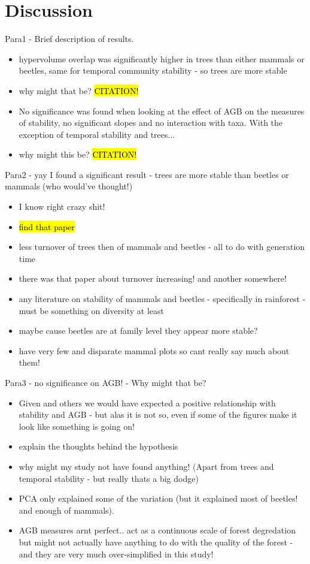 
\section{Discussion}

Para1 - Brief description of results.
\begin{itemize}
	\item hypervolume overlap was significantly higher in trees than either mammals or beetles, same for temporal community stability - so trees are more stable
	\item why might that be? \hl{CITATION!}
	\item No significance was found when looking at the effect of AGB on the measures of stability, no significant slopes and no interaction with taxa. With the exception of temporal stability and trees...
	\item why might this be? \hl{CITATION!}
\end{itemize}

Para2 - yay I found a significant result - trees are more stable than beetles or mammals (who would've thought!)
\begin{itemize}
	\item I know right crazy shit!
	\item \hl{find that paper}
	\item less turnover of trees then of mammals and beetles - all to do with generation time
	\item there was that paper about turnover increasing! \citep{Phillips1994} and another somewhere!\
	\item any literature on stability of mammals and beetles - specifically in rainforest - must be something on diversity at least
	\item maybe cause beetles are at family level they appear more stable?
	\item have very few and disparate mammal plots so cant really say much about them!
\end{itemize}

Para3 - no significance on AGB! - Why might that be?
\begin{itemize}
	\item Given \citep{Tilman2006} and others we would have expected a positive relationship with stability and AGB - but alas it is not so, even if some of the figures make it look like something is going on!
	\item explain the thoughts behind the hypothesis
	\item why might my study not have found anything! (Apart from trees and temporal stability - but really thats a big dodge)
	\item PCA only explained some of the variation (but it explained most of beetles! and enough of mammals).
	\item AGB measures arnt perfect.. act as a continuous scale of forest degredation but might not actually have anything to do with the quality of the forest - and they are very much over-simplified in this study!
\end{itemize}


